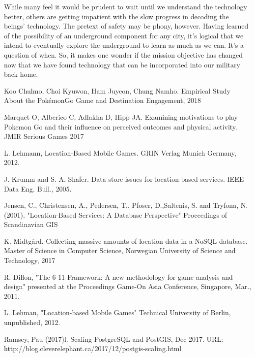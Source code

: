 \documentclass[conference]{IEEEtran}
\begin{document}
While many feel it would be prudent to wait until we understand the technology better, others are getting impatient with the slow progress in decoding the beings’ technology. The pretext of safety may be phony, however.  Having learned of the possibility of an underground component for any city, it’s logical that we intend to eventually explore the underground to learn as much as we can. It’s a question of when. So, it makes one wonder if the mission objective has changed now that we have found technology that can be incorporated into our  military back home. 


\begin{thebibliography}{1}
  
Koo Chulmo, Choi Kyuwon, Ham Juyeon, Chung Namho. Empirical Study About the PokémonGo Game and Destination Engagement, 2018

Marquet O, Alberico C, Adlakha D, Hipp JA. Examining motivations to play Pokemon Go and their influence on perceived
outcomes and physical activity. JMIR Serious Games 2017

L. Lehmann, Location-Based Mobile Games. GRIN Verlag Munich Germany, 2012.

J. Krumm and S. A. Shafer. Data store issues for location-based services. IEEE Data Eng. Bull., 2005.

Jensen, C., Christensen, A., Pedersen, T., Pfoser, D.,Saltenis, S. and Tryfona, N. (2001). "Location-Based Services: A Database Perspective" Proceedings of Scandinavian GIS

K. Midtgård. Collecting massive amounts of location data in a NoSQL database. Master of Science in Computer Science, Norwegian University of Science and Technology, 2017

R. Dillon, "The 6-11 Framework: A new methodology for game analysis and design" presented at the Proceedings Game-On Asia Conference, Singapore, Mar., 2011.

L. Lehman, "Location-based Mobile Games" Technical University of Berlin, unpublished, 2012.

Ramsey, Pau (2017)l. Scaling PostgreSQL and PostGIS, Dec 2017. URL: http://blog.cleverelephant.ca/2017/12/postgis-scaling.html

\end{thebibliography}
\end{document}
